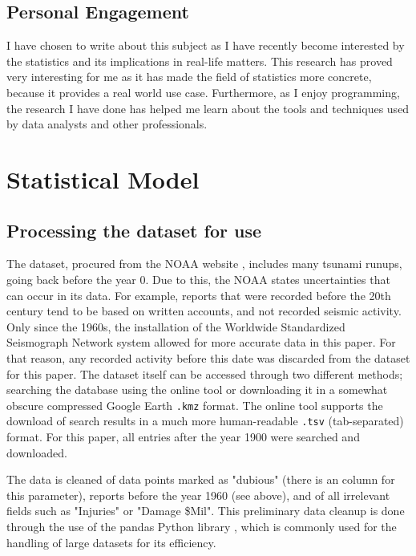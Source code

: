 \documentclass[11pt,letterpaper]{article}
\begin{document}
\subsection{Personal Engagement}

I have chosen to write about this subject as I have recently become interested by the
statistics and its implications in real-life matters. This research has proved very
interesting for me as it has made the field of statistics more concrete, because it provides 
a real world use case. Furthermore, as I enjoy programming, the research I have done 
has helped me learn about the tools and techniques used by data analysts and other professionals.

\section{Statistical Model}

\subsection{Processing the dataset for use}
The dataset, procured from the NOAA website \cite{noaa}, includes many tsunami
runups, going back before the year 0. Due to this, the NOAA states uncertainties
that can occur in its data. For example, reports that were recorded before the
20th century tend to be based on written accounts, and not recorded seismic activity.
Only since the 1960s, the installation of the Worldwide Standardized Seismograph
Network system allowed for more accurate data in this paper. For that reason, any recorded
activity before this date was discarded from the dataset for this paper. The dataset itself can
be accessed through two different methods; searching the database using the online
tool or downloading it in a somewhat obscure compressed Google Earth \verb|.kmz| format. 
The online tool supports the download of search results in a much more human-readable 
\verb|.tsv| (tab-separated) format. For this paper, all entries after the year 1900 were searched and downloaded.
    
The data is cleaned of data points marked as "dubious" (there is an column for this parameter), 
reports before the year 1960 (see above), and of all irrelevant fields such as "Injuries" 
or "Damage \$Mil". This preliminary data cleanup
is done through the use of the pandas Python library \cite{reback2020pandas}\cite{mckinney-proc-scipy-2010}, 
which is commonly used for the handling of large datasets for its efficiency. 
\end{document}
